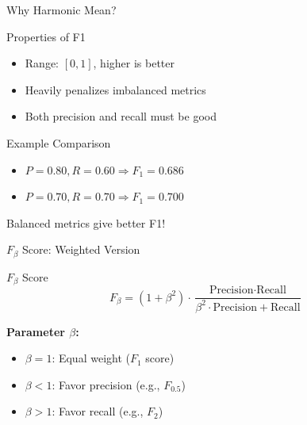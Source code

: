 \documentclass{beamer}
\begin{document}
\begin{frame}{Why Harmonic Mean?}
\begin{keypointsbox}{Properties of F1}
\small
\begin{itemize}
    \item Range: $[0, 1]$, higher is better
    \item Heavily penalizes imbalanced metrics
    \item Both precision and recall must be good
\end{itemize}
\end{keypointsbox}

\vspace{0.15cm}

\begin{examplebox}{Example Comparison}
\small
\begin{itemize}
    \item $P=0.80, R=0.60 \Rightarrow F_1 = 0.686$
    \item $P=0.70, R=0.70 \Rightarrow F_1 = 0.700$
\end{itemize}

Balanced metrics give better F1!
\end{examplebox}
\end{frame}

\begin{frame}{$F_\beta$ Score: Weighted Version}
\begin{definitionbox}{$F_\beta$ Score}
\small
$$F_\beta = (1 + \beta^2) \cdot \frac{\text{Precision} \cdot \text{Recall}}{\beta^2 \cdot \text{Precision} + \text{Recall}}$$

\vspace{0.2cm}

\textbf{Parameter $\beta$:}
\begin{itemize}
    \item $\beta = 1$: Equal weight ($F_1$ score)
    \item $\beta < 1$: Favor precision (e.g., $F_{0.5}$)
    \item $\beta > 1$: Favor recall (e.g., $F_2$)
\end{itemize}
\end{definitionbox}
\end{frame}
\end{document}

